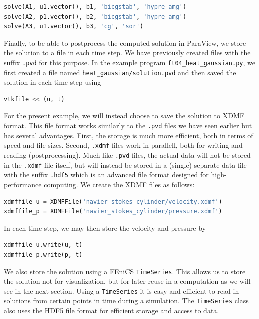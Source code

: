 \documentclass[graybox,envcountchap,sectrefs,final]{svmonodo}
\begin{document}

\begin{lstlisting}[language=Python,style=graycolor]
solve(A1, u1.vector(), b1, 'bicgstab', 'hypre_amg')
solve(A2, p1.vector(), b2, 'bicgstab', 'hypre_amg')
solve(A3, u1.vector(), b3, 'cg', 'sor')
\end{lstlisting}

Finally, to be able to postprocess the computed solution in ParaView,
we store the solution to a file in each time step. We have previously
created files with the suffix \texttt{.pvd} for this purpose. In the example
program
\href{{https://fenicsproject.org/pub/tutorial/python/vol1/ft04_heat_gaussian.py}}{\nolinkurl{ft04_heat_gaussian.py}},
we first created a file named \Verb!heat_gaussian/solution.pvd! and then
saved the solution in each time step using
\begin{lstlisting}[language=Python,style=graycolor]
vtkfile << (u, t)
\end{lstlisting}

For the present example, we will instead choose to save the solution
to XDMF format. This file format works similarly to the \texttt{.pvd} files
we have seen earlier but has several advantages. First, the storage is
much more efficient, both in terms of speed and file sizes. Second,
\texttt{.xdmf} files work in parallell, both for writing and reading
(postprocessing). Much like \texttt{.pvd} files, the actual data will not be
stored in the \texttt{.xdmf} file itself, but will instead be stored in a
(single) separate data file with the suffix \texttt{.hdf5} which is an
advanced file format designed for high-performance computing.
We create the XDMF files as follows:

\begin{lstlisting}[language=Python,style=graycolor]
xdmffile_u = XDMFFile('navier_stokes_cylinder/velocity.xdmf')
xdmffile_p = XDMFFile('navier_stokes_cylinder/pressure.xdmf')
\end{lstlisting}
In each time step, we may then store the velocity and pressure by
\begin{lstlisting}[language=Python,style=graycolor]
xdmffile_u.write(u, t)
xdmffile_p.write(p, t)
\end{lstlisting}


We also store the solution using a FEniCS \texttt{TimeSeries}. This allows us
to store the solution not for visualization, but for later reuse in a
computation as we will see in the next section. Using a \texttt{TimeSeries}
it is easy and efficient to read in solutions from certain points in
time during a simulation. The \texttt{TimeSeries} class also uses the HDF5
file format for efficient storage and access to data.
\end{document}
